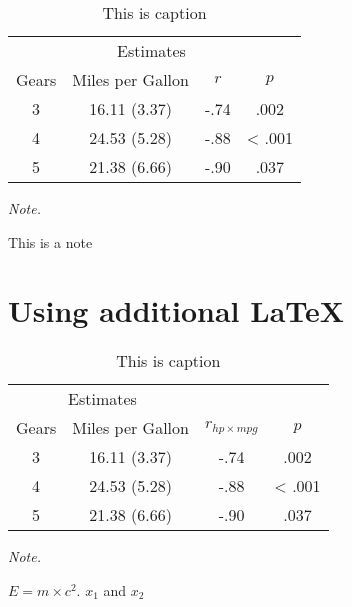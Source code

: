 \documentclass[
  english,
  man,floatsintext]{apa6}
\begin{document}
\begin{table}

\caption{\label{tab:unnamed-chunk-9}This is caption}
\centering
\begin{threeparttable}
\begin{tabular}[t]{cccc}
\toprule
\multicolumn{1}{c}{ } & \multicolumn{2}{c}{Estimates} \\
\cmidrule(l{3pt}r{3pt}){2-3}
Gears & Miles per Gallon & $r$ & $p$\\
\midrule
3 & 16.11 (3.37) & -.74 & .002\\
4 & 24.53 (5.28) & -.88 & < .001\\
5 & 21.38 (6.66) & -.90 & .037\\
\bottomrule
\end{tabular}
\begin{tablenotes}[para]
\item \textit{Note.} 
\item This is a note
\end{tablenotes}
\end{threeparttable}
\end{table}

\newpage

\hypertarget{using-additional-latex}{%
\section{Using additional LaTeX}\label{using-additional-latex}}

\begin{table}

\caption{\label{tab:unnamed-chunk-10}This is caption}
\centering
\begin{threeparttable}
\begin{tabular}[t]{cccc}
\toprule
\multicolumn{2}{c}{Estimates} \\
\cmidrule(l{3pt}r{3pt}){1-2}
Gears & Miles per Gallon & $r_{hp \times mpg}$ & $p$\\
\midrule
3 & 16.11 (3.37) & -.74 & .002\\
4 & 24.53 (5.28) & -.88 & < .001\\
5 & 21.38 (6.66) & -.90 & .037\\
\bottomrule
\end{tabular}
\begin{tablenotes}[para]
\item \textit{Note.} 
\item $E = m \times c^{2}$. $x_1$ and $x_2$
\end{tablenotes}
\end{threeparttable}
\end{table}
\end{document}
